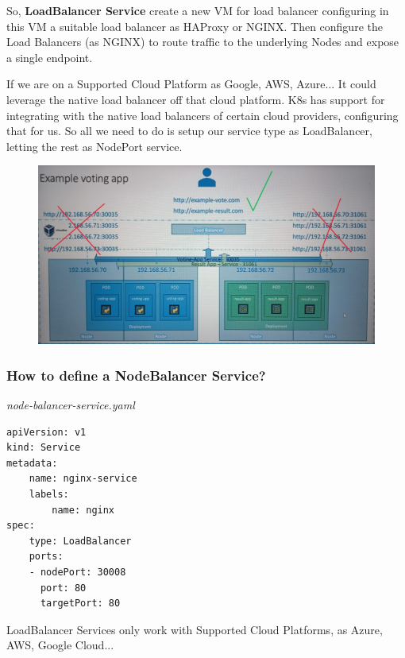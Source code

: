 \documentclass{article}
\newenvironment{blocktemplateIII}[1]{%
    \tcolorbox[beamer,%
    noparskip,breakable,
    ,colframe=Red,%
    colbacklower=LimeGreen!75!LightGreen,%
    title=#1]}%
    {\endtcolorbox}
\newenvironment{codetemplate}[1][]{%
  \mybasecolorbox[#1]
  \itshape
}{%
  \endmybasecolorbox
}
\begin{document}
So, \textbf{LoadBalancer Service} create a new VM for load balancer configuring in this VM a suitable load balancer as HAProxy or NGINX. Then configure the Load Balancers (as NGINX) to route traffic to the underlying Nodes and expose a single endpoint.

If we are on a Supported Cloud Platform as Google, AWS, Azure... It could leverage the native load balancer off that cloud platform. K8s has support for integrating with the native load balancers of certain cloud providers, configuring that for us. So all we need to do is setup our service type as LoadBalancer, letting the rest as NodePort service.

\begin{figure}[H]
    \centering
    \includegraphics[width=\textwidth]{pictures/services5.jpeg}
\end{figure}

\subsubsection{How to define a NodeBalancer Service?}

\begin{codetemplate}{node-balancer-service.yaml}
\begin{verbatim}
apiVersion: v1
kind: Service
metadata:
    name: nginx-service
    labels:
        name: nginx
spec:
    type: LoadBalancer
    ports:
    - nodePort: 30008
      port: 80
      targetPort: 80
\end{verbatim}
\end{codetemplate}

\begin{blocktemplateIII}{WARNING}
LoadBalancer Services only work with Supported Cloud Platforms, as Azure, AWS, Google Cloud...    
\end{blocktemplateIII}
\end{document}
